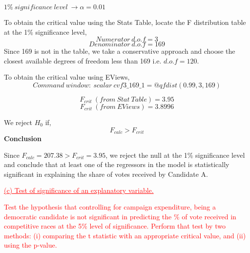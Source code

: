 \documentclass[12pt]{report}
\begin{document}
\noindent $1\%\ significance\ level\ \to \alpha = 0.01$

\noindent To obtain the critical value using the Stats Table, locate the F distribution table at the 1\% significance level,
$$Numerator\ d.o.f = 3$$
$$Denominator\ d.o.f = 169$$
\noindent Since 169 is not in the table, we take a conservative approach and choose the closest available degrees of freedom less than 169 i.e. $d.o.f=120$. 
\begin{figure}[H]
	\centering
\end{figure}
\vspace{-\baselineskip}
\noindent To obtain the critical value using EViews,
$$Command\ window:\ scalar\ cvf3\_169\_1=@qfdist(0.99,3,169)$$
\begin{figure}[H]
	\centering
\end{figure}
\vspace{-\baselineskip}
\begin{figure}[H]
	\centering
\end{figure}
\vspace{-\baselineskip}
\begin{figure}[H]
	\centering
\end{figure}
\vspace{-\baselineskip}
$$F_{crit}\ (from\ Stat\ Table) = 3.95$$
$$F_{crit}\ (from\ EViews) = 3.8996$$

\noindent We reject $H_0$ if,
$$F_{calc} > F_{crit}$$
\noindent \textbf{Conclusion}

\noindent Since $F_{calc}=207.38>F_{crit}=3.95$, we reject the null at the 1\% significance level and conclude that at least one of the regressors in the model is statistically significant in explaining the share of votes received by Candidate A.

\newpage
\noindent \textcolor{red}
{
	\uline{(c) Test of significance of an explanatory variable.}
}

\noindent \textcolor{red}
{
	Test the hypothesis that controlling for campaign expenditure, being a democratic candidate is not significant in predicting the \% of vote received in competitive races at the 5\% level of significance. Perform that test by two methods: 
	(i) comparing the t statistic with an appropriate critical value, and 
	(ii) using the p-value.
}
\end{document}
